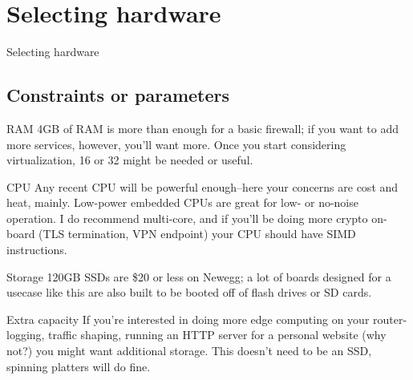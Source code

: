 \documentclass[bigger]{beamer}
\begin{document}
\section{Selecting hardware}
\label{sec:org7a3497d}
\begin{frame}
  Selecting hardware
\end{frame}
\subsection{Constraints or parameters}
\label{sec:org9880863}

\begin{frame}[label={sec:org4c417ad}]{RAM}
4GB of RAM is more than enough for a basic firewall; if you want to add more
services, however, you'll want more. Once you start considering
virtualization, 16 or 32 might be needed or useful.
\end{frame}

\begin{frame}[label={sec:org5a31146}]{CPU}
Any recent CPU will be powerful enough--here your concerns are cost and
heat, mainly. Low-power embedded CPUs are great for low- or no-noise
operation. I do recommend multi-core, and if you'll be doing more crypto
on-board (TLS termination, VPN endpoint) your CPU should have SIMD
instructions.
\end{frame}

\begin{frame}[label={sec:org7599d13}]{Storage}
120GB SSDs are \$20 or less on Newegg; a lot of boards designed for a usecase
like this are also built to be booted off of flash drives or SD cards.

\begin{block}{Extra capacity}
If you're interested in doing more edge computing on your router-logging,
traffic shaping, running an HTTP server for a personal website (why not?)
you might want additional storage. This doesn't need to be an SSD, spinning
platters will do fine.
\end{block}
\end{frame}
\end{document}
